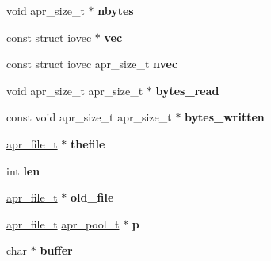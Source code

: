 \begin{DoxyCompactItemize}
void apr\+\_\+size\+\_\+t $\ast$ {\bfseries nbytes}
\item 
\mbox{\label{group__apr__file__io_ga420062dd6c4c06e35af11490633f18b9}} 
const struct iovec $\ast$ {\bfseries vec}
\item 
\mbox{\label{group__apr__file__io_gacb23e6e628f47db01b56c8cbc43a45f1}} 
const struct iovec apr\+\_\+size\+\_\+t {\bfseries nvec}
\item 
\mbox{\label{group__apr__file__io_ga6d0d38373afd55f3787eb6b338b6d938}} 
void apr\+\_\+size\+\_\+t apr\+\_\+size\+\_\+t $\ast$ {\bfseries bytes\+\_\+read}
\item 
\mbox{\label{group__apr__file__io_ga7d9454fe5158de0840be4f856b193a87}} 
const void apr\+\_\+size\+\_\+t apr\+\_\+size\+\_\+t $\ast$ {\bfseries bytes\+\_\+written}
\item 
\mbox{\label{group__apr__file__io_ga78ca4b53249bdca0726c4ffec7132aa9}} 
\mbox{\hyperlink{structapr__file__t}{apr\+\_\+file\+\_\+t}} $\ast$ {\bfseries thefile}
\item 
\mbox{\label{group__apr__file__io_ga7aaae9d6ec4ff865ec20a5ca802dc3af}} 
int {\bfseries len}
\item 
\mbox{\label{group__apr__file__io_gaa84bca3ba7bffb38fe4cd7c53efcbccd}} 
\mbox{\hyperlink{structapr__file__t}{apr\+\_\+file\+\_\+t}} $\ast$ {\bfseries old\+\_\+file}
\item 
\mbox{\label{group__apr__file__io_ga2e727f881424334cf12d8af10f50ec6c}} 
\mbox{\hyperlink{structapr__file__t}{apr\+\_\+file\+\_\+t}} \mbox{\hyperlink{group__apr__pools_gaf137f28edcf9a086cd6bc36c20d7cdfb}{apr\+\_\+pool\+\_\+t}} $\ast$ {\bfseries p}
\item 
\mbox{\label{group__apr__file__io_gaff2566f4c366b48d73479bef43ee4d2e}} 
char $\ast$ {\bfseries buffer}
\item 
\mbox{\label{group__apr__file__io_gaacff821b2b2a35a43f6b1db27538e122}} 

\end{DoxyCompactItemize}
